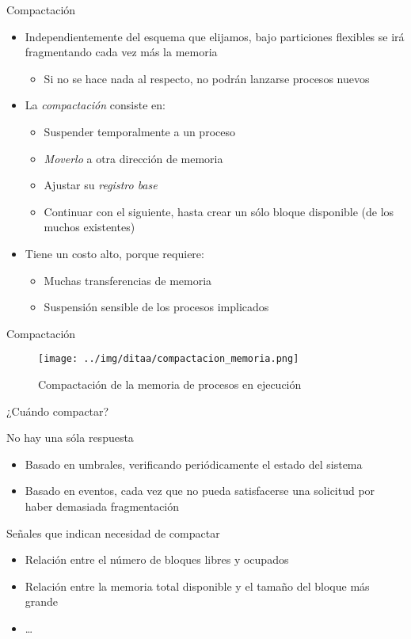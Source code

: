 \documentclass[presentation]{beamer}
\begin{document}
\begin{frame}[label={sec:orgaa8c941}]{Compactación}
\begin{itemize}
\item Independientemente del esquema que elijamos, bajo particiones
flexibles se irá fragmentando cada vez más la memoria
\begin{itemize}
\item Si no se hace nada al respecto, no podrán lanzarse procesos nuevos
\end{itemize}
\item La \emph{compactación} consiste en:
\begin{itemize}
\item Suspender temporalmente a un proceso
\item \emph{Moverlo} a otra dirección de memoria
\item Ajustar su \emph{registro base}
\item Continuar con el siguiente, hasta crear un sólo bloque disponible
(de los muchos existentes)
\end{itemize}
\item Tiene un costo alto, porque requiere:
\begin{itemize}
\item Muchas transferencias de memoria
\item Suspensión sensible de los procesos implicados
\end{itemize}
\end{itemize}
\end{frame}

\begin{frame}[label={sec:org5a03f53}]{Compactación}
\begin{figure}[htbp]
\centering
\texttt{[image: ../img/ditaa/compactacion\_memoria.png]}
\caption{Compactación de la memoria de procesos en ejecución}
\end{figure}
\end{frame}

\begin{frame}[label={sec:org8fd69e1}]{¿Cuándo compactar?}
\begin{center}
No hay una sóla respuesta
\end{center}
\begin{itemize}
\item Basado en umbrales, verificando periódicamente el estado del sistema
\item Basado en eventos, cada vez que no pueda satisfacerse una solicitud
por haber demasiada fragmentación
\end{itemize}
\begin{center}
Señales que indican necesidad de compactar
\end{center}
\begin{itemize}
\item Relación entre el número de bloques libres y ocupados
\item Relación entre la memoria total disponible y el tamaño del bloque
más grande
\item \ldots{}
\end{itemize}
\end{frame}
\end{document}
